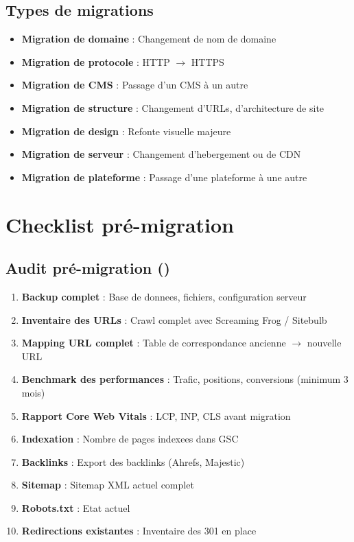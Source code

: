 \subsection{Types de migrations}

\begin{itemize}
    \item \textbf{Migration de domaine} : Changement de nom de domaine
    \item \textbf{Migration de protocole} : HTTP $\rightarrow$ HTTPS
    \item \textbf{Migration de CMS} : Passage d'un CMS à un autre
    \item \textbf{Migration de structure} : Changement d'URLs, d'architecture de site
    \item \textbf{Migration de design} : Refonte visuelle majeure
    \item \textbf{Migration de serveur} : Changement d'hebergement ou de CDN
    \item \textbf{Migration de plateforme} : Passage d'une plateforme à une autre
\end{itemize}

\section{Checklist pré-migration}

\subsection{Audit pré-migration ()}

\begin{enumerate}
    \item \textbf{Backup complet} : Base de donnees, fichiers, configuration serveur
    \item \textbf{Inventaire des URLs} : Crawl complet avec Screaming Frog / Sitebulb
    \item \textbf{Mapping URL complet} : Table de correspondance ancienne $\rightarrow$ nouvelle URL
    \item \textbf{Benchmark des performances} : Trafic, positions, conversions (minimum 3 mois)
    \item \textbf{Rapport Core Web Vitals} : LCP, INP, CLS avant migration
    \item \textbf{Indexation} : Nombre de pages indexees dans GSC
    \item \textbf{Backlinks} : Export des backlinks (Ahrefs, Majestic)
    \item \textbf{Sitemap} : Sitemap XML actuel complet
    \item \textbf{Robots.txt} : Etat actuel
    \item \textbf{Redirections existantes} : Inventaire des 301 en place
\end{enumerate}

